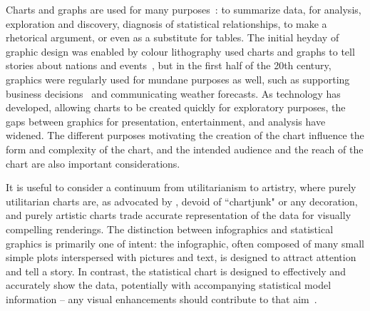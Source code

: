 \documentclass[letterpaper]{ar-1col}\usepackage[]{graphicx}\usepackage[]{color}
\begin{document}
Charts and graphs are used for many purposes~\citep{tukeyGraphicSemigraphicDisplays1972,fienbergGraphicalMethodsStatistics1979}: to summarize data, for analysis, exploration and discovery, diagnosis of statistical relationships, to make a rhetorical argument, or even as a substitute for tables. The initial heyday of graphic design was enabled by colour lithography used charts and graphs to tell stories about nations and events~\citep{kostelnickReEmergenceEmotionalAppeals2016}, but in the first half of the 20th century, graphics were regularly used for mundane purposes as well, such as supporting business decisions~\citep{chandarGraphStandardizationManagement2012,yatesGraphsManagerialTool1985a} and communicating weather forecasts. As technology has developed, allowing charts to be created quickly for exploratory purposes, the gaps between graphics for presentation, entertainment, and analysis have widened. The different purposes motivating the creation of the chart influence the form and complexity of the chart, and the intended audience and the reach of the chart are also important considerations.

It is useful to consider a continuum from utilitarianism to artistry, where purely utilitarian charts are, as advocated by \citet{tufte}, devoid of ``chartjunk" or any decoration, and purely artistic charts trade accurate representation of the data for visually compelling renderings. The distinction between infographics and statistical graphics is primarily one of intent: the infographic, often composed of many small simple plots interspersed with pictures and text, is designed to attract attention and tell a story. In contrast, the statistical chart is designed to effectively and accurately show the data, potentially with accompanying statistical model information -- any visual enhancements should contribute to that aim~\citep{gelmanInfovisStatisticalGraphics2013,wickham2013graphical}.
\end{document}

